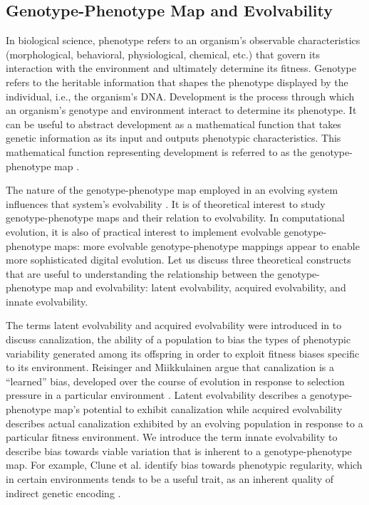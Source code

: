 \subsection{Genotype-Phenotype Map and Evolvability}

In biological science, phenotype refers to an organism's observable characteristics (morphological, behavioral, physiological, chemical, etc.) that govern its interaction with the environment and ultimately determine its fitness.
Genotype refers to the heritable information that shapes the phenotype displayed by the individual, i.e., the organism's DNA.
Development is the process through which an organism's genotype and environment interact to determine its phenotype.
It can be useful to abstract development as a mathematical function that takes genetic information as its input and outputs phenotypic characteristics.
This mathematical function representing development is referred to as the genotype-phenotype map \cite{alberch1991genes}.

The nature of the genotype-phenotype map employed in an evolving system influences that system's evolvability \cite{pigliucci2010genotype}.
It is of theoretical interest to study genotype-phenotype maps and their relation to evolvability.
In computational evolution, it is also of practical interest to implement evolvable genotype-phenotype maps: more evolvable genotype-phenotype mappings appear to enable more sophisticated digital evolution.
Let us discuss three theoretical constructs that are useful to understanding the relationship between the genotype-phenotype map and evolvability: latent evolvability, acquired evolvability, and innate evolvability.

The terms latent evolvability and acquired evolvability were introduced in \cite{reisinger2005towards} to discuss canalization, the ability of a population to bias the types of phenotypic variability generated among its offspring in order to exploit fitness biases specific to its environment.
Reisinger and Miikkulainen argue that canalization is a ``learned'' bias, developed over the course of evolution in response to selection pressure in a particular environment \cite{reisinger2005towards}.
Latent evolvability describes a genotype-phenotype map's potential to exhibit canalization while acquired evolvability describes actual canalization exhibited by an evolving population in response to a particular fitness environment.
We introduce the term innate evolvability to describe bias towards viable variation that is inherent to a genotype-phenotype map.
For example, Clune et al. identify bias towards phenotypic regularity, which in certain environments tends to be a useful trait, as an inherent quality of indirect genetic encoding \cite{clune2008generative}.

